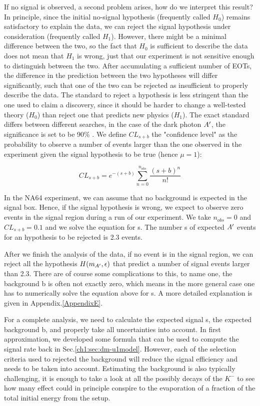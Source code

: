 If no signal is observed, a second problem arises, how do we interpret this result? In principle, since the initial no-signal hypothesis (frequently called $H_0$) remains satisfactory to explain the data, we can reject the signal hypothesis under consideration (frequently called $H_1$). However, there might be a minimal difference between the two, so the fact that $H_0$ is sufficient to describe the data does not mean that $H_1$ is wrong, just that our experiment is not sensitive enough to distinguish between the two. After accumulating a sufficient number of EOTs, the difference in the prediction between the two hypotheses will differ significantly, such that one of the two can be rejected as insufficient to properly describe the data. The standard to reject a hypothesis is less stringent than the one used to claim a discovery, since it should be harder to change a well-tested theory ($H_0$) than reject one that predicts new physics ($H_1$). The exact standard differs between different searches, in the case of the dark photon $A'$, the significance is set to be 90\% \cite{battaglieri2017cosmic}. We define $CL_{s+b}$ the "confidence level" as the probability to observe a number of events larger than the one observed in the experiment given the signal hypothesis to be true (hence $\mu = 1$):

\begin{equation}
  \label{eq:confidence-level-poisson}
  CL_{s+b} = e^{-(s+b)}\sum^{n_{obs}}_{n=0} \frac{(s+b)^n}{n!}
\end{equation}

In the NA64 experiment, we can assume that no background is expected in the signal box. Hence, if the signal hypothesis is wrong, we expect to observe zero events in the signal region during a run of our experiment. We take $n_{obs} = 0$ and $CL_{s+b} = 0.1$ and we solve the equation for s. The number s of expected $A'$ events for an hypothesis to be rejected is 2.3 events.

After we finish the analysis of the data, if no event is in the signal region, we can reject all the hypothesis $H(m_{A'}, \epsilon)$ that predict a number of signal events larger than 2.3. There are of course some complications to this, to name one, the background b is often not exactly zero, which means in the more general case one has to numerically solve the equation above for s. A more detailed explanation is given in Appendix.\ref{AppendixE}.

For a complete analysis, we need to calculate the expected signal s, the expected background b, and properly take all uncertainties into account. In first approximation, we developed some formula that can be used to compute the signal rate back in Sec.\ref{ch1:sec:dm-u1model}. However, each of the selection criteria used to rejected the background will reduce the signal efficiency and needs to be taken into account. Estimating the background is also typically challenging, it is enough to take a look at all the possibly decays of the $K^-$\cite{particle-strange-mesons} to see how many effect could in principle conspire to the evaporation of a fraction of the total initial energy from the setup.

